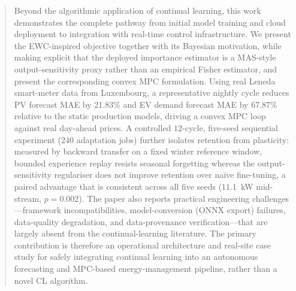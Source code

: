 \begin{abstract}
Beyond the algorithmic application of continual learning, this work demonstrates the complete pathway from initial model training and cloud deployment to integration with real-time control infrastructure. We present the EWC-inspired objective together with its Bayesian motivation, while making explicit that the deployed importance estimator is a MAS-style output-sensitivity proxy rather than an empirical Fisher estimator, and present the corresponding convex MPC formulation. Using real Leneda smart-meter data from Luxembourg, a representative nightly cycle reduces PV forecast MAE by 21.83\% and EV demand forecast MAE by 67.87\% relative to the static production models, driving a convex MPC loop against real day-ahead prices. A controlled $12$-cycle, five-seed sequential experiment ($240$ adaptation jobs) further isolates retention from plasticity: measured by backward transfer on a fixed winter reference window, bounded experience replay resists seasonal forgetting whereas the output-sensitivity regulariser does not improve retention over na\"ive fine-tuning, a paired advantage that is consistent across all five seeds ($11.1$~kW mid-stream, $p{=}0.002$). The paper also reports practical engineering challenges---framework incompatibilities, model-conversion (ONNX export) failures, data-quality degradation, and data-provenance verification---that are largely absent from the continual-learning literature. The primary contribution is therefore an operational architecture and real-site case study for safely integrating continual learning into an autonomous forecasting and MPC-based energy-management pipeline, rather than a novel CL algorithm.

\end{abstract}
